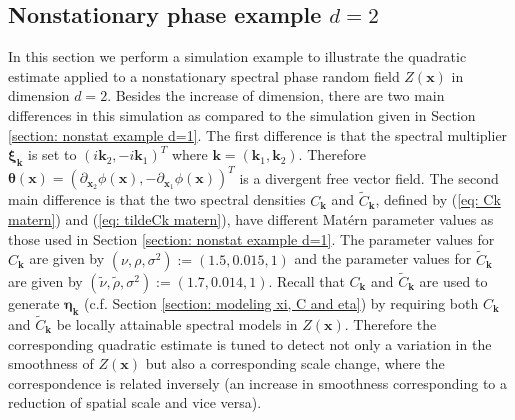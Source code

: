 \documentclass[10pt,noinfoline]{imsart}
\newcommand{\bs}{\boldsymbol}
\begin{document}
\subsection{Nonstationary phase example $d=2$}
\label{section: nonstat example d=2}


In this section we perform a simulation example to illustrate the quadratic estimate applied to a nonstationary spectral phase random field $Z(\bs x)$ in dimension $d=2$. Besides the increase of dimension, there are two main differences in this simulation as compared to the simulation given in Section \ref{section: nonstat example d=1}. The first difference is that the spectral multiplier $\bs \xi_{\bs k}$ is set to $(i\bs k_2, -i\bs k_1)^T$ where $\bs k = (\bs k_1, \bs k_2)$. Therefore $\bs \theta(\bs x) = (\partial_{\bs x_2}\phi(\bs x), -\partial_{\bs x_1}\phi(\bs x))^T$ is a divergent free vector field. The second main difference is that the two spectral densities $C_{\bs k}$ and $\tilde C_{\bs k}$, defined by (\ref{eq: Ck matern}) and (\ref{eq: tildeCk matern}), have different Mat\'ern parameter values as those used in Section \ref{section: nonstat example d=1}. The parameter values for $C_{\bs k}$  are given by $(\nu, \rho, \sigma^2):=(1.5, 0.015, 1)$ and the parameter values for $\tilde C_{\bs k}$ are given by $(\tilde \nu, \tilde\rho, \sigma^2):=(1.7, 0.014, 1)$. Recall that $C_{\bs k}$ and $\tilde C_{\bs k}$ are used to generate $\bs \eta_{\bs k}$ (c.f. Section \ref{section: modeling xi, C and eta}) by requiring both $C_{\bs k}$ and $\tilde C_{\bs k}$ be locally attainable spectral models in $Z(\bs x)$. Therefore the corresponding quadratic estimate is tuned to detect not only a variation in the smoothness of $Z(\bs x)$ but also a corresponding scale change, where the correspondence is related inversely (an increase in smoothness corresponding to a reduction of spatial scale and vice versa).
\end{document}
